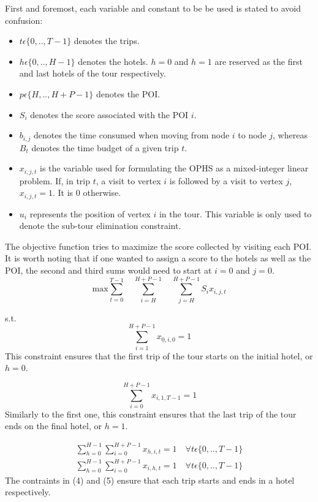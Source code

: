 First and foremost, each variable and constant to be be used is stated to avoid confusion:
\begin{itemize}
    \item $t\epsilon \{0,..,T-1\}$ denotes the trips.
    \item $h\epsilon \{0,..,H-1\}$ denotes the hotels. $h=0$ and $h=1$ are reserved as the first and last hotels of the tour respectively.
    \item $p\epsilon \{H,..,H+P-1\}$ denotes the POI.
    \item $S_i$ denotes the score associated with the POI $i$.
    \item $b_{i,j}$ denotes the time consumed when moving from node $i$ to node $j$, whereas $B_t$ denotes the time budget of a given trip $t$.
    \item $x_{i,j,t}$ is the variable used for formulating the OPHS as a mixed-integer linear problem. If, in trip $t$, a visit to vertex $i$ is followed by a visit to vertex $j$, $x_{i,j,t}=1$. It is $0$ otherwise.
    \item $u_i$ represents the position of vertex $i$ in the tour. This variable is only used to denote the sub-tour elimination constraint.
\end{itemize}

The objective function tries to maximize the score collected by visiting each POI. It is worth noting that if one wanted to assign a score to the hotels as well as the POI, the second and third sums would need to start at $i=0$ and $j=0$.
\begin{equation}
    \text{max} \sum_{t=0}^{T-1} \quad \sum_{i=H}^{H+P-1} \quad \sum_{j=H}^{H+P-1} S_i x_{i,j,t}
\end{equation}

s.t.
\begin{equation}
    \sum_{i=1}^{H+P-1} x_{0,i,0} = 1
\end{equation}
This constraint ensures that the first trip of the tour starts on the initial hotel, or $h=0$.

\begin{equation}
    \sum_{i=0}^{H+P-1} x_{i,1,T-1} = 1
\end{equation}
Similarly to the first one, this constraint ensures that the last trip of the tour ends on the final hotel, or $h=1$.

\begin{eqnarray}
    \sum_{h=0}^{H-1} \sum_{i=0}^{H+P-1} x_{h,i,t} = 1 \quad \forall t\epsilon \{0,..,T-1\}\\
    \sum_{h=0}^{H-1} \sum_{i=0}^{H+P-1} x_{i,h,t} = 1 \quad \forall t\epsilon \{0,..,T-1\}
\end{eqnarray}
The contraints in (4) and (5) ensure that each trip starts and ends in a hotel respectively.

